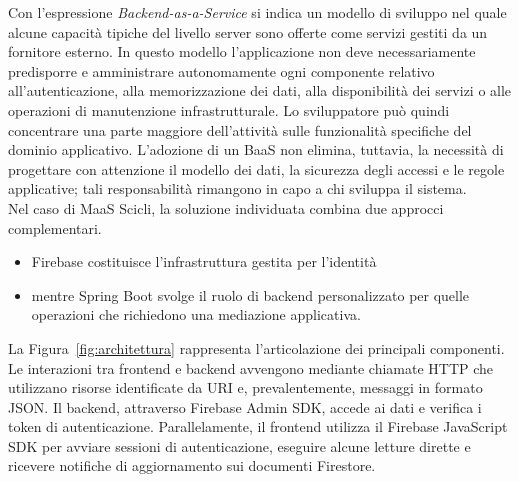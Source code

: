 Con l'espressione \emph{Backend-as-a-Service} si indica un modello di sviluppo nel quale alcune capacità tipiche del livello server sono offerte come servizi gestiti da un fornitore esterno. In questo modello l'applicazione non deve necessariamente predisporre e amministrare autonomamente ogni componente relativo all'autenticazione, alla memorizzazione dei dati, alla disponibilità dei servizi o alle operazioni di manutenzione infrastrutturale. Lo sviluppatore può quindi concentrare una parte maggiore dell'attività sulle funzionalità specifiche del dominio applicativo. L'adozione di un BaaS non elimina, tuttavia, la necessità di progettare con attenzione il modello dei dati, la sicurezza degli accessi e le regole applicative; tali responsabilità rimangono in capo a chi sviluppa il sistema.
\\
Nel caso di MaaS Scicli, la soluzione individuata combina due approcci complementari. 
\begin{itemize}
    \item Firebase costituisce l'infrastruttura gestita per l'identità
    \item mentre Spring Boot svolge il ruolo di backend personalizzato per quelle operazioni che richiedono una mediazione applicativa.
\end{itemize}
La Figura~\ref{fig:architettura} rappresenta l'articolazione dei principali componenti. Le interazioni tra frontend e backend avvengono mediante chiamate HTTP che utilizzano risorse identificate da URI e, prevalentemente, messaggi in formato JSON. 
Il backend, attraverso Firebase Admin SDK, accede ai dati e verifica i token di autenticazione. Parallelamente, il frontend utilizza il Firebase JavaScript SDK per avviare sessioni di autenticazione, eseguire alcune letture dirette e ricevere notifiche di aggiornamento sui documenti Firestore.

